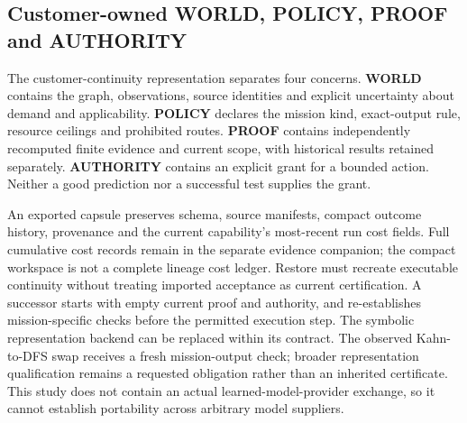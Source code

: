 \documentclass[11pt]{article}
\begin{document}
\subsection{Customer-owned WORLD, POLICY, PROOF and AUTHORITY}

The customer-continuity representation separates four concerns. \textbf{WORLD} contains the graph, observations, source identities and explicit uncertainty about demand and applicability. \textbf{POLICY} declares the mission kind, exact-output rule, resource ceilings and prohibited routes. \textbf{PROOF} contains independently recomputed finite evidence and current scope, with historical results retained separately. \textbf{AUTHORITY} contains an explicit grant for a bounded action. Neither a good prediction nor a successful test supplies the grant.

An exported capsule preserves schema, source manifests, compact outcome history, provenance and the current capability's most-recent run cost fields. Full cumulative cost records remain in the separate evidence companion; the compact workspace is not a complete lineage cost ledger. Restore must recreate executable continuity without treating imported acceptance as current certification. A successor starts with empty current proof and authority, and re-establishes mission-specific checks before the permitted execution step. The symbolic representation backend can be replaced within its contract. The observed Kahn-to-DFS swap receives a fresh mission-output check; broader representation qualification remains a requested obligation rather than an inherited certificate. This study does not contain an actual learned-model-provider exchange, so it cannot establish portability across arbitrary model suppliers.
\end{document}
